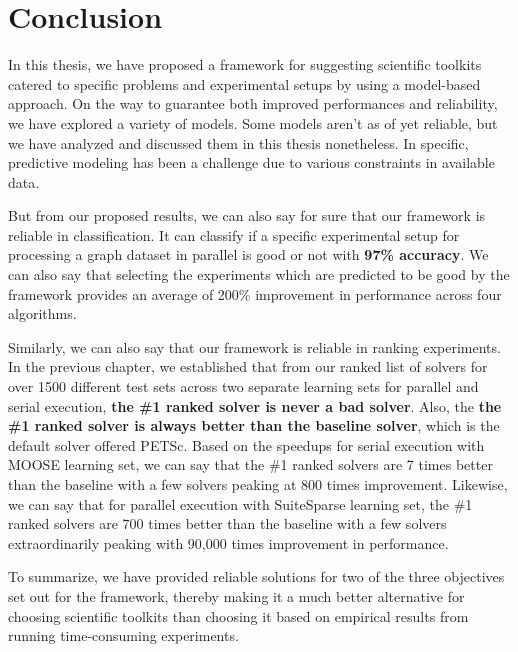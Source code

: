\chapter{Conclusion} \label{matrixfree}
In this thesis, we have proposed a framework for suggesting scientific toolkits catered to specific problems and experimental setups by using a model-based approach. On the way to guarantee both improved performances and reliability, we have explored a variety of models. Some models aren't as of yet reliable, but we have analyzed and discussed them in this thesis nonetheless. In specific, predictive modeling has been a challenge due to various constraints in available data. 
 
 But from our proposed results, we can also say for sure that our framework is reliable in classification. It can classify if a specific experimental setup for processing a graph dataset in parallel is good or not with \textbf{97\% accuracy}. We can also say that selecting the experiments which are predicted to be good by the framework provides an average of 200\% improvement in performance across four algorithms.    
 
 Similarly, we can also say that our framework is reliable in ranking experiments. In the previous chapter, we established that from our ranked list of solvers for over 1500 different test sets across two separate learning sets for parallel and serial execution, \textbf{the \#1 ranked solver is never a bad solver}. Also, the \textbf{the \#1 ranked solver is always better than the baseline solver}, which is the default solver offered PETSc. Based on the speedups for serial execution with MOOSE learning set, we can say that the \#1 ranked solvers are 7 times better than the baseline with a few solvers peaking at 800 times improvement. Likewise, we can say that for parallel execution with SuiteSparse learning set, the \#1 ranked solvers are 700 times better than the baseline with a few solvers extraordinarily peaking with 90,000 times improvement in performance.
 
 To summarize, we have provided reliable solutions for two of the three objectives set out for the framework, thereby making it a much better alternative for choosing scientific toolkits than choosing it based on empirical results from running time-consuming experiments. 
